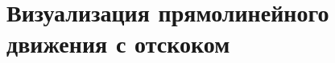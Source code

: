 \section[Визуализация прямолинейного движения с отскоком]{Визуализация прямолинейного движения с отскоком}
